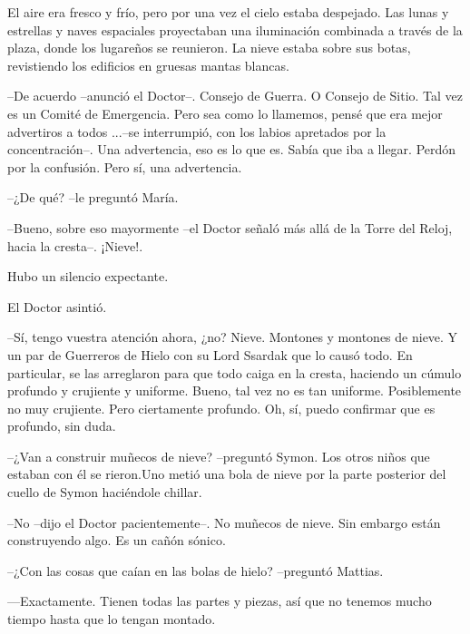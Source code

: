 \mbox{}



El aire era fresco y frío, pero por una vez el cielo estaba despejado. Las lunas y estrellas y naves espaciales proyectaban una iluminación combinada a través de la plaza, donde los lugareños se reunieron. La nieve estaba sobre sus botas, revistiendo los edificios en gruesas mantas blancas.



--De acuerdo --anunció el Doctor--. Consejo de Guerra. O Consejo de Sitio. Tal vez es un Comité de Emergencia. Pero sea como lo llamemos, pensé que era mejor advertiros a todos ...--se interrumpió, con los labios apretados por la concentración--. Una advertencia, eso es lo que es. Sabía que iba a llegar. Perdón por la confusión. Pero sí, una advertencia.



--¿De qué? --le preguntó María.



--Bueno, sobre eso mayormente --el Doctor señaló más allá de la Torre del Reloj, hacia la cresta--. ¡Nieve!.



Hubo un silencio expectante.



El Doctor asintió.


--Sí, tengo vuestra atención ahora, ¿no?  Nieve. Montones y montones de nieve. Y un par de Guerreros de Hielo con su Lord Ssardak que lo causó todo. En particular, se las arreglaron para que todo caiga en la cresta, haciendo un cúmulo profundo y crujiente y uniforme. Bueno, tal vez no es tan uniforme. Posiblemente no muy crujiente. Pero ciertamente profundo. Oh, sí, puedo confirmar que es profundo, sin duda.



--¿Van a construir muñecos de nieve? --preguntó Symon. Los otros niños que estaban con él se rieron.Uno metió una bola de nieve por la parte posterior del cuello de Symon haciéndole chillar.



--No --dijo el Doctor pacientemente--. No muñecos de nieve. Sin embargo están construyendo algo. Es un cañón sónico.



--¿Con las cosas que caían en las bolas de hielo? --preguntó Mattias.



—Exactamente. Tienen todas las partes y piezas, así que no tenemos mucho tiempo hasta que lo tengan montado.



